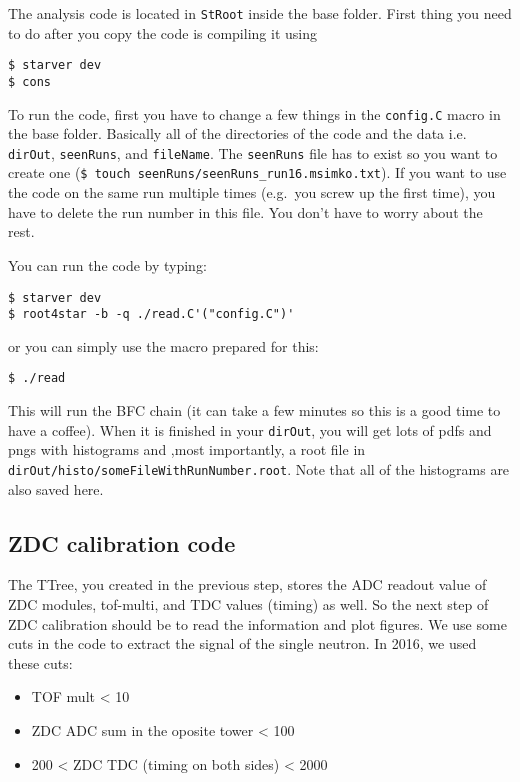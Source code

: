 The analysis code is located in \texttt{StRoot} inside the base folder. First thing you need to do after you
copy the code is compiling it using
\begin{verbatim}
$ starver dev
$ cons
\end{verbatim}
To run the code, first you have to change a few things in the \texttt{config.C} macro in the base folder. 
Basically all of the
directories of the code and the data i.e. \texttt{dirOut}, \texttt{seenRuns}, and \texttt{fileName}. 
The \texttt{seenRuns} file has to
exist so you want to create one (\texttt{\$ touch seenRuns/seenRuns\_run16.msimko.txt}). If you want to use the code
on the same run multiple times (e.g.\ you screw up the first time), you have to delete the run number in
this file. You don't have to worry
about the rest.

You can run the code by typing:
\begin{verbatim}
$ starver dev
$ root4star -b -q ./read.C'("config.C")'
\end{verbatim}
or you can simply use the macro prepared for this:
\begin{verbatim}
$ ./read
\end{verbatim}
This will run the BFC chain (it can take a few minutes so this is a good time to have a coffee). When it is finished
in your \texttt{dirOut}, you will get lots of pdfs and pngs with histograms and ,most importantly, a root file in
\texttt{dirOut/histo/someFileWithRunNumber.root}. Note that all of the histograms are also saved here.

\subsection{ZDC calibration code}\hypertarget{zdc-calibration-code}{}\label{zdc-calibration-code}



The TTree, you created in the previous step, stores the ADC readout value of ZDC modules, tof-multi, and
TDC values (timing) as well. 
So the next step of ZDC calibration
should be to read the information and plot figures.
We use some cuts in the code to extract the signal of the single neutron. In 2016, we used these cuts:

\begin{itemize}
\item TOF mult \textless{} 10
\item ZDC ADC sum in the oposite tower \textless{} 100
\item 200 \textless{} ZDC TDC (timing on both sides) \textless{} 2000
\end{itemize}

